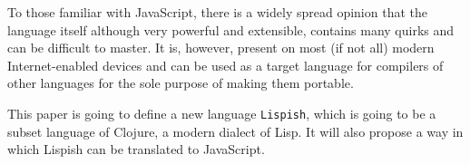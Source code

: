 To those familiar with JavaScript, there is a widely spread opinion that the language itself although very powerful and extensible, contains many quirks and can be difficult to master. It is, however, present on most (if not all) modern Internet-enabled devices and can be used as a target language for compilers of other languages for the sole purpose of making them portable. 

This paper is going to define a new language \texttt{Lispish}, which is going to be a subset language of Clojure, a modern dialect of Lisp. It will also propose a way in which Lispish can be translated to JavaScript.
